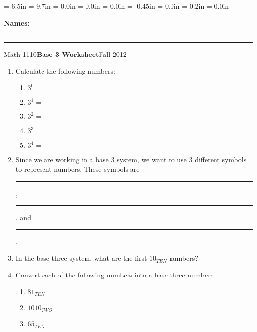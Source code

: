 \documentclass{article}
\begin{document}
\textwidth = 6.5in
\textheight = 9.7in
\oddsidemargin = 0.0in
\evensidemargin = 0.0in
\topmargin = 0.0in
\headheight = -0.45in
\headsep = 0.0in
\parskip = 0.2in
\parindent = 0.0in

\pagestyle{empty}

\textbf{Names:} \rule{6.1in}{0.01in}

\vspace{0.3in}

\noindent\rule{6.7in}{0.01in}

\centerline{Math 1110\hfill{\bf Base 3 Worksheet}\hfill Fall 2012}

\vspace{0.2in}

\begin{enumerate}
\item Calculate the following numbers:
\begin{enumerate}
\item $3^0=$  
\item $3^1=$  
\item $3^2=$  
\item $3^3=$  
\item $3^4=$
\end{enumerate}

\vspace{0.2in}

\item Since we are working in a base 3 system, we want to use 3 different symbols to represent numbers. These symbols are \rule{0.5in}{0.01in}, \rule{0.5in}{0.01in}, and \rule{0.5in}{0.01in}.

\vspace{0.2in}

\item In the base three system, what are the first $10_{TEN}$ numbers?

\vspace{1.5in}

\item Convert each of the following numbers into a base three number:
\begin{enumerate}
\item $81_{TEN}$

\vspace{0.5in}

\item $1010_{TWO}$

\vspace{0.5in}

\item $65_{TEN}$


\end{enumerate}
\end{enumerate}
\end{document}
